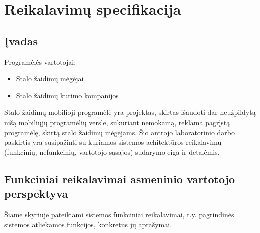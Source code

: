 \documentclass{VUMIFPSkursinis}
\begin{document}
\section{Reikalavimų specifikacija}

\subsection{Įvadas}

Programėlės vartotojai: 
\begin{itemize}
	\item Stalo žaidimų mėgėjai
	\item Stalo žaidimų kūrimo kompanijos
\end{itemize}

Stalo žaidimų mobilioji programėlė yra projektas, skirtas išaudoti dar neužpildytą nišą mobiliųjų programėlių versle, sukuriant nemokamą, reklama pagrįstą programėlę, skirtą stalo žaidimų mėgėjams. 
Šio antrojo laboratorinio darbo paskirtis yra susipažinti su kuriamos sistemos achitektūros reikalavimų (funkcinių, nefunkcinių, vartotojo sąsajos) sudarymo eiga ir detalėmis.

\subsection{Funkciniai reikalavimai asmeninio vartotojo perspektyva}
Šiame skyriuje pateikiami sistemos funkciniai reikalavimai, t.y. pagrindinės sistemos atliekamos funkcijos, konkretūs jų aprašymai.

\newcommand\rownumberfr{\stepcounter{frcount}\arabic{frcount}}
\end{document}
